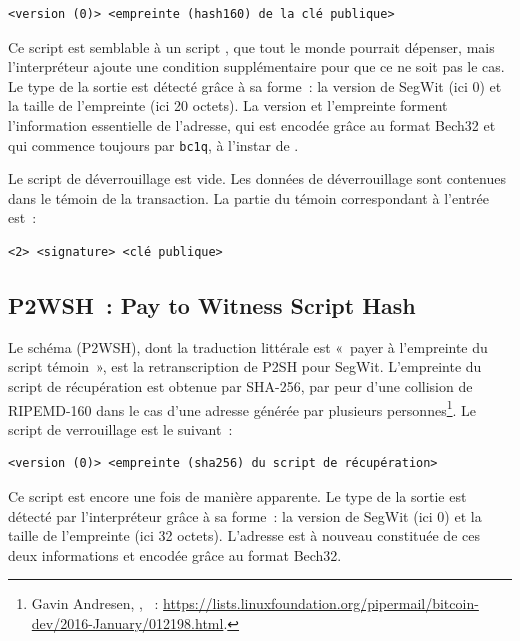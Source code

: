 \begin{Verbatim}[fontsize=\footnotesize]
<version (0)> <empreinte (hash160) de la clé publique>
\end{Verbatim}

Ce script est semblable à un script , que tout le monde pourrait dépenser, mais l'interpréteur ajoute une condition supplémentaire pour que ce ne soit pas le cas. Le type de la sortie est détecté grâce à sa forme~: la version de SegWit (ici 0) et la taille de l'empreinte (ici 20 octets). La version et l'empreinte forment l'information essentielle de l'adresse, qui est encodée grâce au format Bech32 et qui commence toujours par \texttt{bc1q}, à l'instar de .

Le script de déverrouillage est vide. Les données de déverrouillage sont contenues dans le témoin de la transaction. La partie du témoin correspondant à l'entrée est~:

\begin{Verbatim}[fontsize=\footnotesize]
<2> <signature> <clé publique>
\end{Verbatim}

\subsection{P2WSH~: Pay to Witness Script Hash} Le schéma  (P2WSH), dont la traduction littérale est «~payer à l'empreinte du script témoin~», est la retranscription de P2SH pour SegWit. L'empreinte du script de récupération est obtenue par SHA-256, par peur d'une collision de RIPEMD-160 dans le cas d'une adresse générée par plusieurs personnes\footnote{Gavin Andresen, , ~: \url{https://lists.linuxfoundation.org/pipermail/bitcoin-dev/2016-January/012198.html}.}. Le script de verrouillage est le suivant~:

\begin{Verbatim}[fontsize=\footnotesize]
<version (0)> <empreinte (sha256) du script de récupération>
\end{Verbatim}

Ce script est encore une fois  de manière apparente. Le type de la sortie est détecté par l'interpréteur grâce à sa forme~: la version de SegWit (ici 0) et la taille de l'empreinte (ici 32 octets). L'adresse est à nouveau constituée de ces deux informations et encodée grâce au format Bech32.

